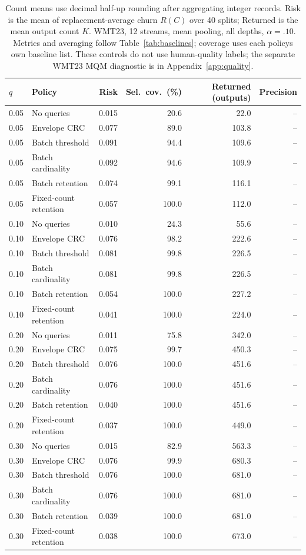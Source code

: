 \begin{table}[t]
\centering\small
\begin{tabular}{llrrrr}
\toprule
$q$ & Policy & Risk & Sel.\ cov.\ (\%) & Returned (outputs) & Precision \\
\midrule
0.05 & No queries & 0.015 & 20.6 & 22.0 & -- \\
0.05 & Envelope CRC & 0.077 & 89.0 & 103.8 & -- \\
0.05 & Batch threshold & 0.091 & 94.4 & 109.6 & -- \\
0.05 & Batch cardinality & 0.092 & 94.6 & 109.9 & -- \\
0.05 & Batch retention & 0.074 & 99.1 & 116.1 & -- \\
0.05 & Fixed-count retention & 0.057 & 100.0 & 112.0 & -- \\
0.10 & No queries & 0.010 & 24.3 & 55.6 & -- \\
0.10 & Envelope CRC & 0.076 & 98.2 & 222.6 & -- \\
0.10 & Batch threshold & 0.081 & 99.8 & 226.5 & -- \\
0.10 & Batch cardinality & 0.081 & 99.8 & 226.5 & -- \\
0.10 & Batch retention & 0.054 & 100.0 & 227.2 & -- \\
0.10 & Fixed-count retention & 0.041 & 100.0 & 224.0 & -- \\
0.20 & No queries & 0.011 & 75.8 & 342.0 & -- \\
0.20 & Envelope CRC & 0.075 & 99.7 & 450.3 & -- \\
0.20 & Batch threshold & 0.076 & 100.0 & 451.6 & -- \\
0.20 & Batch cardinality & 0.076 & 100.0 & 451.6 & -- \\
0.20 & Batch retention & 0.040 & 100.0 & 451.6 & -- \\
0.20 & Fixed-count retention & 0.037 & 100.0 & 449.0 & -- \\
0.30 & No queries & 0.015 & 82.9 & 563.3 & -- \\
0.30 & Envelope CRC & 0.076 & 99.9 & 680.3 & -- \\
0.30 & Batch threshold & 0.076 & 100.0 & 681.0 & -- \\
0.30 & Batch cardinality & 0.076 & 100.0 & 681.0 & -- \\
0.30 & Batch retention & 0.039 & 100.0 & 681.0 & -- \\
0.30 & Fixed-count retention & 0.038 & 100.0 & 673.0 & -- \\
\bottomrule
\end{tabular}
\caption{Count means use decimal half-up rounding after aggregating integer records. Risk is the mean of replacement-average churn $R(C)$ over 40 splits; Returned is the mean output count $K$. WMT23, 12 streams, mean pooling, all depths, $\alpha=.10$. Metrics and averaging follow Table~\ref{tab:baselines}; coverage uses each policy\textquotesingle s own baseline list. These controls do not use human-quality labels; the separate WMT23 MQM diagnostic is in Appendix~\ref{app:quality}.}
\label{tab:baseline-2-mean}
\end{table}
